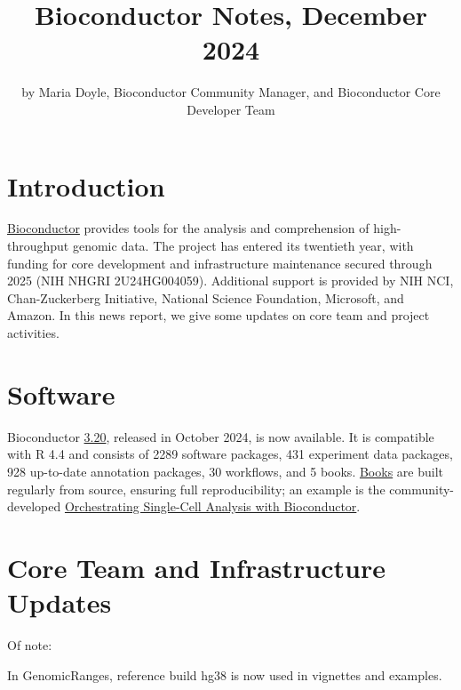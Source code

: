 \title{Bioconductor Notes, December 2024}


\author{by Maria Doyle, Bioconductor Community Manager, and Bioconductor Core Developer Team}

\maketitle


\hypertarget{introduction}{%
\section{Introduction}\label{introduction}}

\href{https://bioconductor.org}{Bioconductor} provides
tools for the analysis and comprehension of high-throughput genomic
data. The project has entered its twentieth year, with funding
for core development and infrastructure maintenance secured
through 2025 (NIH NHGRI 2U24HG004059). Additional support is provided
by NIH NCI, Chan-Zuckerberg Initiative, National Science Foundation,
Microsoft, and Amazon. In this news report, we give some updates on
core team and project activities.

\hypertarget{software}{%
\section{Software}\label{software}}

Bioconductor \href{https://bioconductor.org/news/bioc_3_20_release/}{3.20}, released in October 2024, is now available. It is
compatible with R 4.4 and consists of 2289 software packages, 431
experiment data packages, 928 up-to-date annotation packages, 30
workflows, and 5 books. \href{https://bioconductor.org/books/release/}{Books} are
built regularly from source, ensuring full reproducibility; an example is the
community-developed \href{https://bioconductor.org/books/release/OSCA/}{Orchestrating Single-Cell Analysis with Bioconductor}.

\hypertarget{core-team-and-infrastructure-updates}{%
\section{Core Team and Infrastructure Updates}\label{core-team-and-infrastructure-updates}}

Of note:

In GenomicRanges, reference build hg38 is now used in vignettes
and examples.\\

